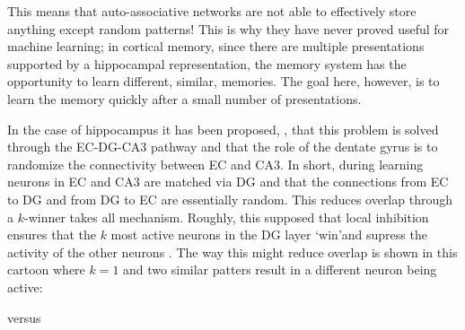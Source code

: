 \documentclass[11pt,a4paper]{scrartcl}
\begin{document}
This means that auto-associative networks are not able to effectively
store anything except random patterns! This is why they have never
proved useful for machine learning; in cortical memory, since there
are multiple presentations supported by a hippocampal representation,
the memory system has the opportunity to learn different, similar,
memories. The goal here, however, is to learn the memory quickly after
a small number of presentations.

In the case of hippocampus it has been proposed,
\cite{OReillyMcClelland1994a}, that this problem is solved through the
EC-DG-CA3 pathway and that the role of the dentate gyrus is to
randomize the connectivity between EC and CA3. In short, during
learning neurons in EC and CA3 are matched via DG and that the
connections from EC to DG and from DG to EC are essentially
random. This reduces overlap through a $k$-winner takes all
mechanism. Roughly, this supposed that local inhibition ensures that
the $k$ most active neurons in the DG layer \lq{}win\rq and supress
the activity of the other neurons \cite{OReillyMcClelland1994a}. The
way this might reduce overlap is shown in this cartoon where $k=1$ and
two similar patters result in a different neuron being active:
\begin{center}
\end{center}
versus
\begin{center}
\end{center}
\end{document}
